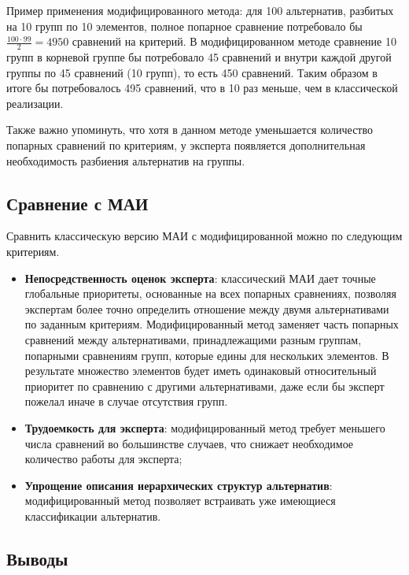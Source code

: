 Пример применения модифицированного метода: для 100 альтернатив, разбитых на 10 групп по 10 элементов, полное попарное сравнение потребовало бы \(\frac{100\cdot 99}{2} = 4950\) сравнений на критерий. 
В модифицированном методе сравнение 10 групп в корневой группе бы потребовало 45 сравнений и внутри каждой другой группы по 45 сравнений (10 групп), то есть 450 сравнений.
Таким образом в итоге бы потребовалось 495 сравнений, что в 10 раз меньше, чем в классической реализации.

Также важно упоминуть, что хотя в данном методе уменьшается количество попарных сравнений по критериям, у эксперта появляется дополнительная необходимость разбиения альтернатив на группы.

\subsection*{Сравнение с МАИ}

Сравнить классическую версию МАИ с модифицированной можно по следующим критериям.

\begin{itemize}
    \item \textbf{Непосредственность оценок эксперта}: классический МАИ дает точные глобальные приоритеты, основанные на всех попарных сравнениях, позволяя экспертам более точно определить отношение между двумя альтернативами по заданным критериям.
    Модифицированный метод заменяет часть попарных сравнений между альтернативами, принадлежащими разным группам, попарными сравнениям групп, которые едины для нескольких элементов.
    В результате множество элементов будет иметь одинаковый относительный приоритет по сравнению с другими альтернативами, даже если бы эксперт пожелал иначе в случае отсутствия групп.
    \item \textbf{Трудоемкость для эксперта}: модифицированный метод требует меньшего числа сравнений во большинстве случаев, что снижает необходимое количество работы для эксперта;
    \item \textbf{Упрощение описания иерархических структур альтернатив}: модифицированный метод позволяет встраивать уже имеющиеся классификации альтернатив.
\end{itemize}

\subsection*{Выводы}

